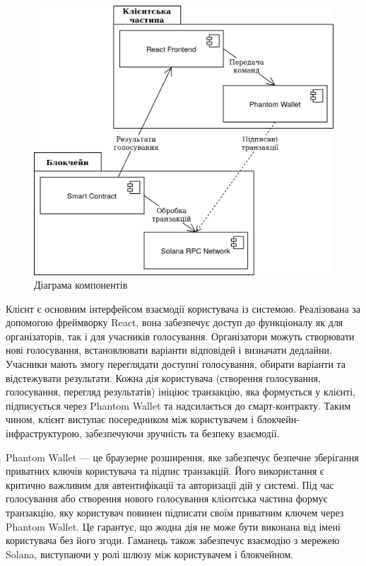 \documentclass[14pt]{extreport}
\begin{document}
  \begin{figure}[H]
    \centering
    \includegraphics[scale=0.24]{UMLComponent}
    \caption{Діаграма компонентів}
    \label{fig:UMLComponent}
  \end{figure}

  Клієнт є основним інтерфейсом взаємодії користувача із системою. Реалізована за допомогою фреймворку React, вона забезпечує доступ до функціоналу як для організаторів, так і для учасників голосування. Організатори можуть створювати нові голосування, встановлювати варіанти відповідей і визначати дедлайни. Учасники мають змогу переглядати доступні голосування, обирати варіанти та відстежувати результати. Кожна дія користувача (створення голосування, голосування, перегляд результатів) ініціює транзакцію, яка формується у клієнті, підписується через Phantom Wallet та надсилається до смарт-контракту. Таким чином, клієнт виступає посередником між користувачем і блокчейн-інфраструктурою, забезпечуючи зручність та безпеку взаємодії.

  Phantom Wallet — це браузерне розширення, яке забезпечує безпечне зберігання приватних ключів користувача та підпис транзакцій. Його використання є критично важливим для автентифікації та авторизації дій у системі. Під час голосування або створення нового голосування клієнтська частина формує транзакцію, яку користувач повинен підписати своїм приватним ключем через Phantom Wallet. Це гарантує, що жодна дія не може бути виконана від імені користувача без його згоди. Гаманець також забезпечує взаємодію з мережею Solana, виступаючи у ролі шлюзу між користувачем і блокчейном.
\end{document}
